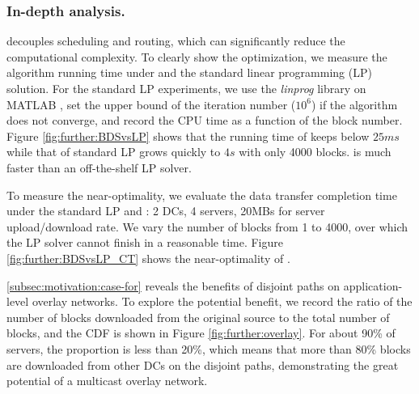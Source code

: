 \subsubsection{In-depth analysis.}\label{subsubsec:evaluation:depth}

 \name decouples scheduling and routing, which can significantly reduce the computational complexity. To clearly show the optimization, we measure the algorithm running time under \name and the standard linear programming (LP) solution. For the standard LP experiments, we use the \textit{linprog} library on MATLAB \cite{mathworks}, set the upper bound of the iteration number ($10^6$) if the algorithm does not converge, and record the CPU time as a function of the block number. Figure \ref{fig:further:BDSvsLP} shows that the running time of \name keeps below $25ms$ while that of standard LP grows quickly to $4s$ with only 4000 blocks. %
\name is much faster than an off-the-shelf LP solver.

 To measure the near-optimality, we evaluate the data transfer completion time under the standard LP and \name: 2 DCs, 4 servers, 20MBs for server upload/download rate.
We vary the number of blocks from 1 to 4000, over which the LP solver cannot finish in a reasonable time. Figure \ref{fig:further:BDSvsLP_CT} shows the near-optimality of \name.%


 \Section\ref{subsec:motivation:case-for} reveals the benefits of disjoint paths on application-level overlay networks. To explore the potential benefit, we record the ratio of the number of blocks downloaded from the original source to the total number of blocks, and the CDF is shown in Figure \ref{fig:further:overlay}. For about 90\% of servers, the proportion is less than 20\%, which means that more than 80\% blocks are downloaded from other DCs on the disjoint paths, demonstrating the great potential of a multicast overlay network.



